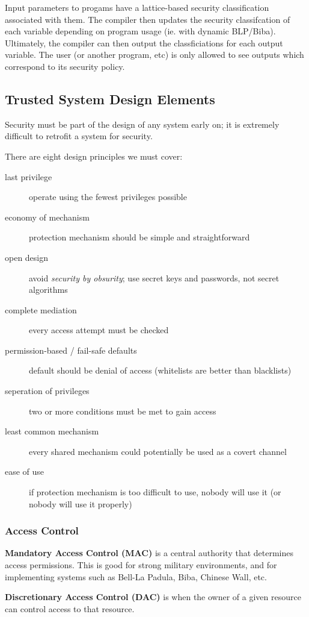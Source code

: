 \documentclass[12pt]{article}
\begin{document}
Input parameters to progams have a lattice-based security classification associated with them. The compiler then updates the security classifcation of each variable depending on program usage (ie. with dynamic BLP/Biba). Ultimately, the compiler can then output the classficiations for each output variable. The user (or another program, etc) is only allowed to see outputs which correspond to its security policy.

\subsection{Trusted System Design Elements}
Security must be part of the design of any system early on; it is extremely difficult to retrofit a system for security.

There are eight design principles we must cover:
\begin{description}
\item[last privilege] operate using the fewest privileges possible
\item[economy of mechanism] protection mechanism should be simple and straightforward
\item[open design] avoid \emph{security by obsurity}; use secret keys and passwords, not secret algorithms
\item[complete mediation] every access attempt must be checked
\item[permission-based / fail-safe defaults] default should be denial of access (whitelists are better than blacklists)
\item[seperation of privileges] two or more conditions must be met to gain access
\item[least common mechanism] every shared mechanism could potentially be used as a covert channel
\item [ease of use] if protection mechanism is too difficult to use, nobody will use it (or nobody will use it properly)
\end{description}

\subsubsection{Access Control}
{\bf Mandatory Access Control (MAC)} is a central authority that determines access permissions. This is good for strong military environments, and for implementing systems such as Bell-La Padula, Biba, Chinese Wall, etc.

{\bf Discretionary Access Control (DAC)} is when the owner of a given resource can control access to that resource.
\end{document}
